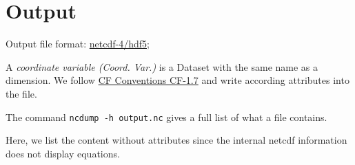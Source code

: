 \section{Output} \label{sec:output_file}
Output file format: \href{https://www.unidata.ucar.edu/software/netcdf/docs/}{netcdf-4/hdf5};

A \textit{coordinate variable (Coord. Var.)} is a Dataset with the same name as a dimension.
We follow
\href{http://cfconventions.org/Data/cf-conventions/cf-conventions-1.7/cf-conventions.html}{CF Conventions CF-1.7}
and write according attributes into the file.

\begin{tcolorbox}[title=Note]
    The command \texttt{ncdump -h output.nc} gives a full list of what a file contains.
\end{tcolorbox}
Here, we list the content without attributes
since the internal netcdf information does not display equations.
%
